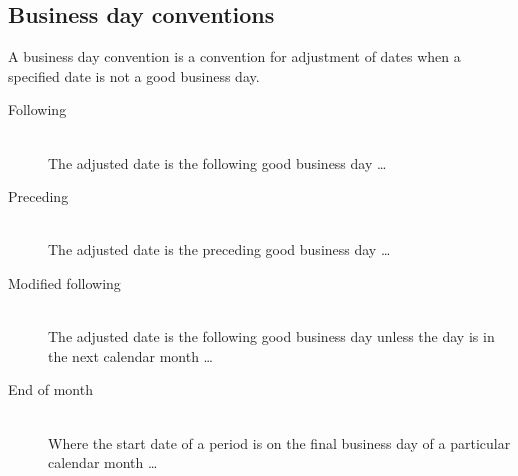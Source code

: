 \documentclass[11pt,a4paper]{article}
\numberwithin{equation}{section}
\begin{document}
	\subsection{Business day conventions}
	A business day convention is a convention for adjustment of dates when a specified date is not a good business day.
	\begin{description}
	  \item[Following] \hfill \\
	The adjusted date is the following good business day \ldots
	  \item[Preceding] \hfill \\
		The adjusted date is the preceding good business day \ldots
	  \item[Modified following] \hfill \\
	  The adjusted date is the following good business day unless the day is in the next calendar month \ldots
	  \item[End of month] \hfill \\
	Where the start date of a period is on the final business day of a particular calendar month \ldots
	\end{description}



\newpage



\end{document}
